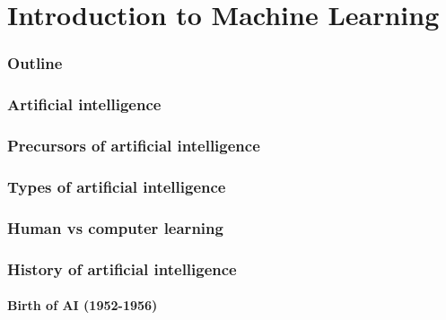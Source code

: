 \renewcommand{\thispart}{1 }
\renewcommand{\thispartname}{Introduction to Machine Learning}

\part{\thispartname}



\section{Outline}


\section{Artificial intelligence}


\section{Precursors of artificial intelligence}


\section{Types of artificial intelligence}


\section{Human vs computer learning}



\section{History of artificial intelligence}

\subsection{Birth of AI (1952-1956)}







